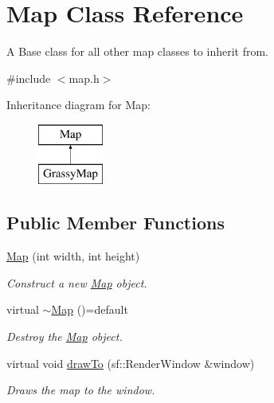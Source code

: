 \hypertarget{classMap}{}\section{Map Class Reference}
\label{classMap}


A Base class for all other map classes to inherit from.  




{\ttfamily \#include $<$map.\+h$>$}

Inheritance diagram for Map\+:\begin{figure}[H]
\begin{center}
\leavevmode
\includegraphics[height=2.000000cm]{classMap}
\end{center}
\end{figure}
\subsection*{Public Member Functions}
\begin{DoxyCompactItemize}
\item 
\mbox{\hyperlink{classMap_a8497952fd6e1f0584d868e6ceb97d42d}{Map}} (int width, int height)
\begin{DoxyCompactList}\small\item\em Construct a new \mbox{\hyperlink{classMap}{Map}} object. \end{DoxyCompactList}\item 
virtual \mbox{\hyperlink{classMap_a1debdd8c6fec2993906ec9626045c80c}{$\sim$\+Map}} ()=default
\begin{DoxyCompactList}\small\item\em Destroy the \mbox{\hyperlink{classMap}{Map}} object. \end{DoxyCompactList}\item 
virtual void \mbox{\hyperlink{classMap_acbc620429ff8e8de0a62ad322581535f}{draw\+To}} (sf\+::\+Render\+Window \&window)
\begin{DoxyCompactList}\small\item\em Draws the map to the window. \end{DoxyCompactList}\end{DoxyCompactItemize}
